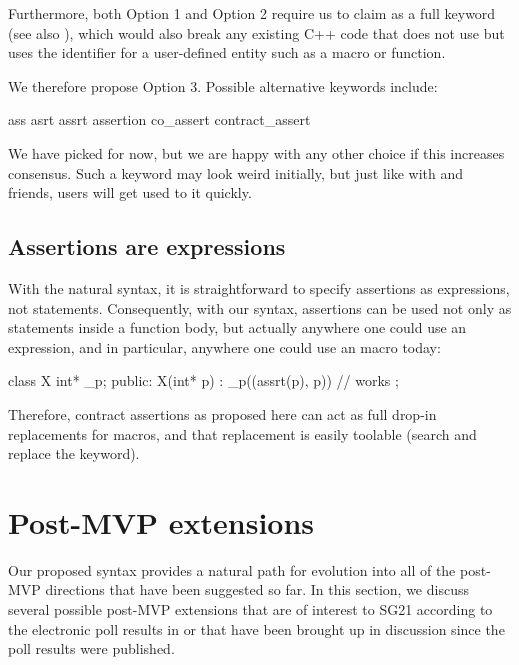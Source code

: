 Furthermore, both Option 1 and Option 2 require us to claim  as a full keyword (see also \cite{P2884R0}), which would also break any existing C++ code that does not use  but uses the identifier  for a user-defined entity such as a macro or function.

We therefore propose Option 3. Possible alternative keywords include:

\begin{codeblock}
ass                         
asrt                        
assrt                       
assertion                   
co_assert
contract_assert
\end{codeblock}

We have picked  for now, but we are happy with any other choice if this increases consensus. Such a keyword may look weird initially, but just like with  and friends, users will get used to it quickly.

\subsection{Assertions are expressions}
\label{subsec:assrtxpr}

With the natural syntax, it is straightforward to specify assertions as expressions, not statements. Consequently, with our syntax, assertions can be used not only as statements inside a function body, but actually anywhere one could use an expression, and in particular, anywhere one could use an  macro today:

\vspace{2mm}
\begin{codeblock}
class X {
  int* _p;
public:
  X(int* p) : _p((assrt(p), p)) {}  // works
};
\end{codeblock} 
\vspace{2mm}

Therefore, contract assertions as proposed here can act as full drop-in replacements for  macros, and that replacement is easily toolable (search and replace the keyword).

\section{Post-MVP extensions}

Our proposed syntax provides a natural path for evolution into all of the post-MVP directions that have been suggested so far. In this section, we discuss several possible post-MVP extensions that are of interest to SG21 according to the electronic poll results in \cite{P2885R2} or that have been brought up in discussion since the poll results were published.

